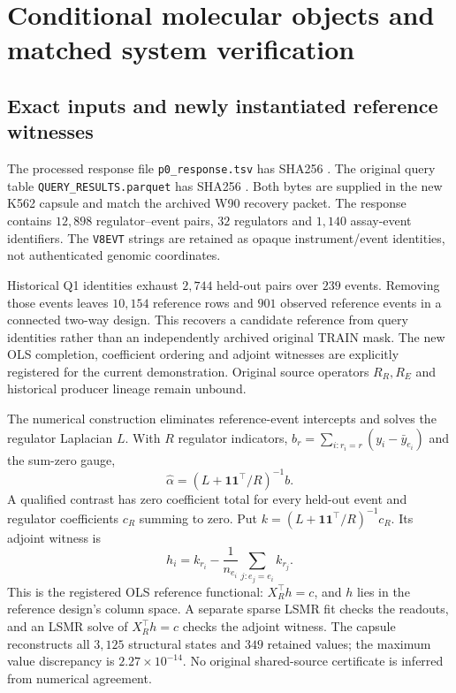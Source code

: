 \FloatBarrier
\section{Conditional molecular objects and matched system verification}\label{sec:s22}
\subsection{Exact inputs and newly instantiated reference witnesses}
The processed response file \nolinkurl{p0_response.tsv} has SHA256 \texttt{}. The original query table \nolinkurl{QUERY_RESULTS.parquet} has SHA256 \texttt{}. Both bytes are supplied in the new K562 capsule and match the archived W90 recovery packet. The response contains $12{,}898$ regulator--event pairs, $32$ regulators and $1{,}140$ assay-event identifiers. The \texttt{V8EVT} strings are retained as opaque instrument/event identities, not authenticated genomic coordinates.

Historical Q1 identities exhaust $2{,}744$ held-out pairs over $239$ events. Removing those events leaves $10{,}154$ reference rows and $901$ observed reference events in a connected two-way design. This recovers a candidate reference from query identities rather than an independently archived original TRAIN mask. The new OLS completion, coefficient ordering and adjoint witnesses are explicitly registered for the current demonstration. Original source operators $R_R,R_E$ and historical producer lineage remain unbound.

The numerical construction eliminates reference-event intercepts and solves the regulator Laplacian $L$. With $R$ regulator indicators, $b_r=\sum_{i:r_i=r}(y_i-\bar y_{e_i})$ and the sum-zero gauge,
\[
\widehat\alpha=(L+\mathbf1\mathbf1^\top/R)^{-1}b.
\]
A qualified contrast has zero coefficient total for every held-out event and regulator coefficients $c_R$ summing to zero. Put $k=(L+\mathbf1\mathbf1^\top/R)^{-1}c_R$. Its adjoint witness is
\[
h_i=k_{r_i}-\frac{1}{n_{e_i}}\sum_{j:e_j=e_i}k_{r_j}.
\]
This is the registered OLS reference functional: $X_R^\top h=c$, and $h$ lies in the reference design's column space. A separate sparse LSMR fit checks the readouts, and an LSMR solve of $X_R^\top h=c$ checks the adjoint witness. The capsule reconstructs all $3{,}125$ structural states and $349$ retained values; the maximum value discrepancy is $2.27\times10^{-14}$. No original shared-source certificate is inferred from numerical agreement.

